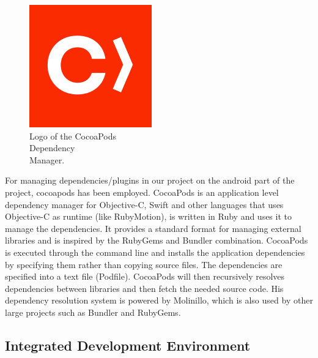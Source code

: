 \begin{figure} %
    \centering
    \includegraphics[width=\linewidth]{images/cocoapods.png}
    \caption{Logo of the CocoaPods\\Dependency\\Manager.}
\end{figure}

For managing dependencies/plugins in our project on the android part of the project, cocoapods has been employed. CocoaPods is an application level dependency manager for Objective-C, Swift and other languages that uses Objective-C as runtime (like RubyMotion), is written in Ruby and uses it to manage the dependencies. It provides a standard format for managing external libraries and is inspired by the RubyGems and Bundler combination. CocoaPods is executed through the command line and installs the application dependencies by specifying them rather than copying source files. The dependencies are specified into a text file (Podfile). CocoaPods will then recursively resolves dependencies between libraries and then fetch the needed source code. His dependency resolution system is powered by Molinillo, which is also used by other large projects such as Bundler and RubyGems\cite{CocoaPods}.

\subsection{Integrated Development Environment}

